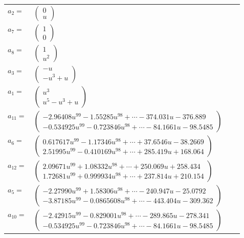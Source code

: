 \documentclass[1p]{elsarticle_modified}
\theoremstyle{definition}
\begin{document}
\begin{tabular}{m{7pt} m{180pt} m{7pt} m{180pt} }
\flushright $a_{2}=$&$\begin{pmatrix}0\\u\end{pmatrix}$ \\
\flushright $a_{7}=$&$\begin{pmatrix}1\\0\end{pmatrix}$ \\
\flushright $a_{8}=$&$\begin{pmatrix}1\\u^2\end{pmatrix}$ \\
\flushright $a_{3}=$&$\begin{pmatrix}- u\\- u^3+u\end{pmatrix}$ \\
\flushright $a_{1}=$&$\begin{pmatrix}u^3\\u^5- u^3+u\end{pmatrix}$ \\
\flushright $a_{11}=$&$\begin{pmatrix}-2.96408 u^{99}-1.55285 u^{98}+\cdots-374.031 u-376.889\\-0.534925 u^{99}-0.723846 u^{98}+\cdots-84.1661 u-98.5485\end{pmatrix}$ \\
\flushright $a_{6}=$&$\begin{pmatrix}0.617617 u^{99}-1.17346 u^{98}+\cdots+37.6546 u-38.2669\\2.51995 u^{99}-0.410169 u^{98}+\cdots+285.419 u+168.064\end{pmatrix}$ \\
\flushright $a_{12}=$&$\begin{pmatrix}2.09671 u^{99}+1.08332 u^{98}+\cdots+250.069 u+258.434\\1.72681 u^{99}+0.999934 u^{98}+\cdots+237.814 u+210.154\end{pmatrix}$ \\
\flushright $a_{5}=$&$\begin{pmatrix}-2.27990 u^{99}+1.58306 u^{98}+\cdots-240.947 u-25.0792\\-3.87185 u^{99}-0.0865608 u^{98}+\cdots-443.404 u-309.362\end{pmatrix}$ \\
\flushright $a_{10}=$&$\begin{pmatrix}-2.42915 u^{99}-0.829001 u^{98}+\cdots-289.865 u-278.341\\-0.534925 u^{99}-0.723846 u^{98}+\cdots-84.1661 u-98.5485\end{pmatrix}$ \\

\end{tabular}
\end{document}
